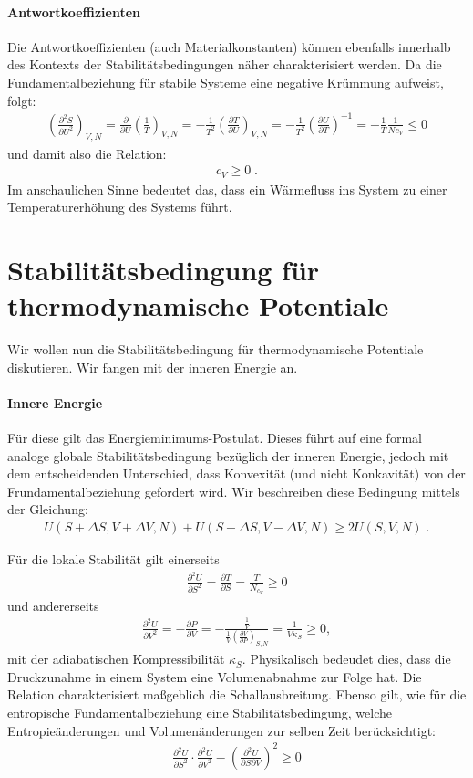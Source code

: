 \paragraph*{Antwortkoeffizienten}
Die Antwortkoeffizienten (auch Materialkonstanten) können ebenfalls innerhalb des Kontexts der Stabilitätsbedingungen näher charakterisiert werden.
Da die Fundamentalbeziehung für stabile Systeme eine negative Krümmung aufweist, folgt:
\begin{align*}
	\left(\frac{\partial ^2 S}{\partial U^2}\right)_{V,N}=\frac{\partial}{\partial U}\left(\frac{1}{T}\right)_{V,N}=-\frac{1}{T^2}\left(\frac{\partial T}{\partial U}\right)_{V,N}=-\frac{1}{T^2}\left(\frac{\partial U}{\partial T}\right)^{-1}=-\frac{1}{T}\frac{1}{Nc_V}\leq0
\end{align*}
	und damit also die Relation:
	\begin{align*}
		\boxed{c_V\geq 0}\;.
	\end{align*}
Im anschaulichen Sinne bedeutet das, dass ein Wärmefluss ins System zu einer Temperaturerhöhung des Systems führt.
\section{Stabilitätsbedingung für thermodynamische Potentiale}
Wir wollen nun die Stabilitätsbedingung für thermodynamische Potentiale diskutieren. Wir fangen mit der inneren Energie an.
\paragraph*{Innere Energie} Für diese gilt das Energieminimums-Postulat. Dieses führt auf eine formal analoge globale Stabilitätsbedingung bezüglich der inneren Energie, jedoch mit dem entscheidenden Unterschied, dass Konvexität (und nicht Konkavität) von der Frundamentalbeziehung gefordert wird. Wir beschreiben diese Bedingung mittels der Gleichung:
\begin{align*}
	\boxed{U(S+\Delta S, V+\Delta V,N)+U(S-\Delta S, V-\Delta V, N)\geq 2U(S,V,N)}\;.
\end{align*}

Für die lokale Stabilität gilt einerseits
\begin{align*}
	\frac{\partial^2U}{\partial S^2}=\frac{\partial T}{\partial S}=\frac{T}{N_{c_V}}\geq 0
\end{align*}
und andererseits
\begin{align*}
	\frac{\partial^2U}{\partial V^2}=-\frac{\partial P}{\partial V}=-\frac{\frac{1}{V}}{\frac{1}{V}\left(\frac{\partial V}{\partial P}\right)_{S,N}}=\frac{1}{V\kappa_S}\geq 0,
\end{align*}
mit der adiabatischen Kompressibilität $\kappa_S$. Physikalisch bedeudet dies, dass die Druckzunahme in einem System eine Volumenabnahme zur Folge hat. Die Relation charakterisiert maßgeblich die Schallausbreitung.
Ebenso gilt, wie für die entropische Fundamentalbeziehung eine Stabilitätsbedingung, welche Entropieänderungen und Volumenänderungen zur selben Zeit berücksichtigt:
\begin{align*}
	\frac{\partial ^2U}{\partial S^2}\cdot\frac{\partial ^2U}{\partial V^2}-\left(\frac{\partial ^2U}{\partial S\partial V}\right)^2\geq 0
\end{align*}
